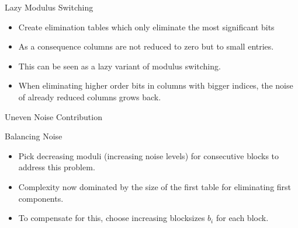 \documentclass[presentation,smaller]{beamer}
\begin{document}
\begin{frame}[label={sec:orgheadline36}]{Lazy Modulus Switching}
\begin{itemize}
\item Create elimination tables which only eliminate the most significant bits
\item As a consequence columns are not reduced to zero but to small entries.
\item This can be seen as a lazy variant of modulus switching.

\item<2-> When eliminating higher order bits in columns with bigger indices, the noise of already reduced columns grows back.
\end{itemize}
\end{frame}

\begin{frame}[label={sec:orgheadline37}]{Uneven Noise Contribution}
\begin{center}
\end{center}
\end{frame}

\begin{frame}[label={sec:orgheadline38}]{Balancing Noise}
\begin{itemize}
\item \alert{Pick decreasing moduli} (increasing noise levels) for consecutive blocks to address this problem.
\item Complexity now dominated by the size of the first table for eliminating first components.
\item To compensate for this, \alert{choose increasing blocksizes} \(b_i\) for each block. 
\end{itemize}
\end{frame}
\end{document}
